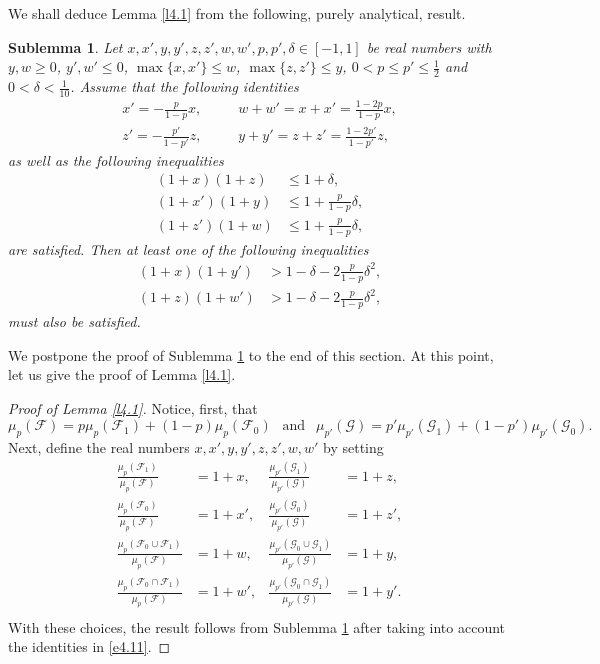 \documentclass[10pt]{amsart}
\newtheorem{sbl}[thm]{Sublemma}
\theoremstyle{remark}
\newcommand{\meg}{\geqslant}
\newcommand{\mik}{\leqslant}
\newcommand{\Fcal}{\mathcal{F}}
\newcommand{\Gcal}{\mathcal{G}}
\newcommand{\pmeasure}[1]{\ensuremath{\mu_{p}\left(#1\right)}}
\begin{document}
We shall deduce Lemma \ref{l4.1} from the following, purely analytical, result.
\begin{sbl} \label{s4.2}
Let $x,x',y,y',z,z',w,w',p,p',\delta\in[-1,1]$ be real numbers with $y,w\meg 0$, $y',w'\mik 0$,
$\max\{x,x'\}\mik w$, $\max\{z,z'\}\mik y$, $0<p\mik p'\mik \frac{1}{2}$ and $0<\delta<\frac{1}{10}$.
Assume that the following identities
\begin{align}
\label{e4.4} x'=-\frac{p}{1-p}x,  & \ \ \ \ \ \ \ \ w+w'=x+x'=\frac{1-2p}{1-p}x, \\
\label{e4.5} z'=-\frac{p'}{1-p'}z, & \ \ \ \ \ \ \ \ y+y'=z+z'=\frac{1-2p'}{1-p'}z,
\end{align}
as well as the following inequalities
\begin{align}
\label{e4.6} (1+x)(1+z)& \mik 1+\delta, \\
\label{e4.7} (1+x')(1+y) & \mik 1+\frac{p}{1-p}\delta,\\
\label{e4.8} (1+z')(1+w) & \mik 1+\frac{p}{1-p}\delta,
\end{align}
are satisfied. Then at least one of the following inequalities
\begin{align}
\label{e4.9} (1+x)(1+y') & > 1-\delta-2\frac{p}{1-p}\delta^2, \\
\label{e4.10} (1+z)(1+w')& > 1-\delta-2\frac{p}{1-p}\delta^2,
\end{align}
must also be satisfied.
\end{sbl}
We postpone the proof of Sublemma \ref{s4.2} to the end of this section. At this point, let us
give the proof of Lemma \ref{l4.1}.
\begin{proof}[Proof of Lemma \emph{\ref{l4.1}}]
Notice, first, that
\begin{equation} \label{e4.11}
\mu_p(\Fcal)=p\mu_p(\Fcal_1) +(1-p)\mu_p(\Fcal_0) \ \ \text{ and } \ \
\mu_{p'}(\Gcal)=p'\mu_{p'}(\Gcal_1) +(1-p')\mu_{p'}(\Gcal_0).
\end{equation}
Next, define the real numbers $x,x',y,y',z,z',w,w'$ by setting
\begin{align*}
\frac{\mu_p(\Fcal_1)}{\mu_p(\Fcal)}&=1+x, & \frac{\mu_{p'}(\Gcal_1)}{\mu_{p'}(\Gcal)} & = 1+z,\\
\frac{\mu_p(\Fcal_0)}{\mu_p(\Fcal)}&=1+x' ,&	\frac{\mu_{p'}(\Gcal_0)}{\mu_{p'}(\Gcal)} & =1+z',\\
\frac{\mu_p(\Fcal_0\cup\Fcal_1)}{\mu_p(\Fcal)}& = 1+w, & \frac{\mu_{p'}(\Gcal_0\cup\Gcal_1)}{\mu_{p'}(\Gcal)} & =1+y,\\
\frac{\mu_p(\Fcal_0\cap\Fcal_1)}{\pmeasure{\Fcal}}&=1+w', & \frac{\mu_{p'}(\Gcal_0\cap\Gcal_1)}{\mu_{p'}(\Gcal)} & =1+y'.\\
\end{align*}
With these choices, the result follows from Sublemma \ref{s4.2} after taking into account the identities in \eqref{e4.11}.
\end{proof}
\end{document}
